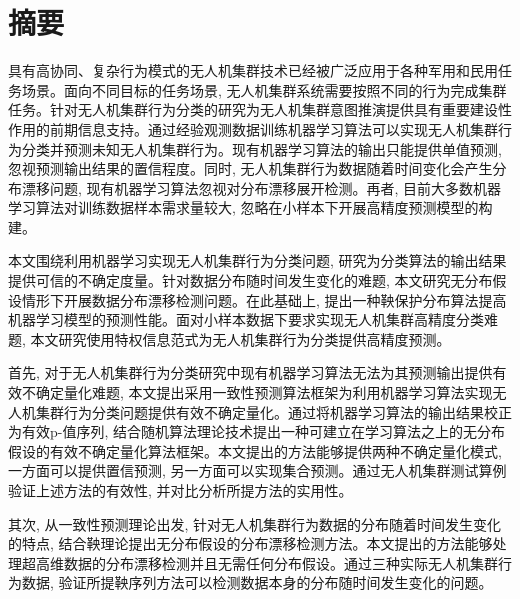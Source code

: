 
\intobmk\chapter*{摘\quad 要}%
\setcounter{page}{1}%

具有高协同、复杂行为模式的无人机集群技术已经被广泛应用于各种军用和民用任务场景。面向不同目标的任务场景, 无人机集群系统需要按照不同的行为完成集群任务。针对无人机集群行为分类的研究为无人机集群意图推演提供具有重要建设性作用的前期信息支持。通过经验观测数据训练机器学习算法可以实现无人机集群行为分类并预测未知无人机集群行为。现有机器学习算法的输出只能提供单值预测, 忽视预测输出结果的置信程度。同时, 无人机集群行为数据随着时间变化会产生分布漂移问题, 现有机器学习算法忽视对分布漂移展开检测。再者, 目前大多数机器学习算法对训练数据样本需求量较大, 忽略在小样本下开展高精度预测模型的构建。

本文围绕利用机器学习实现无人机集群行为分类问题, 研究为分类算法的输出结果提供可信的不确定度量。针对数据分布随时间发生变化的难题, 本文研究无分布假设情形下开展数据分布漂移检测问题。在此基础上, 提出一种鞅保护分布算法提高机器学习模型的预测性能。面对小样本数据下要求实现无人机集群高精度分类难题, 本文研究使用特权信息范式为无人机集群行为分类提供高精度预测。

首先, 对于无人机集群行为分类研究中现有机器学习算法无法为其预测输出提供有效不确定量化难题, 本文提出采用一致性预测算法框架为利用机器学习算法实现无人机集群行为分类问题提供有效不确定量化。通过将机器学习算法的输出结果校正为有效p-值序列, 结合随机算法理论技术提出一种可建立在学习算法之上的无分布假设的有效不确定量化算法框架。本文提出的方法能够提供两种不确定量化模式, 一方面可以提供置信预测, 另一方面可以实现集合预测。通过无人机集群测试算例验证上述方法的有效性, 并对比分析所提方法的实用性。

其次, 从一致性预测理论出发, 针对无人机集群行为数据的分布随着时间发生变化的特点, 结合鞅理论提出无分布假设的分布漂移检测方法。本文提出的方法能够处理超高维数据的分布漂移检测并且无需任何分布假设。通过三种实际无人机集群行为数据, 验证所提鞅序列方法可以检测数据本身的分布随时间发生变化的问题。

